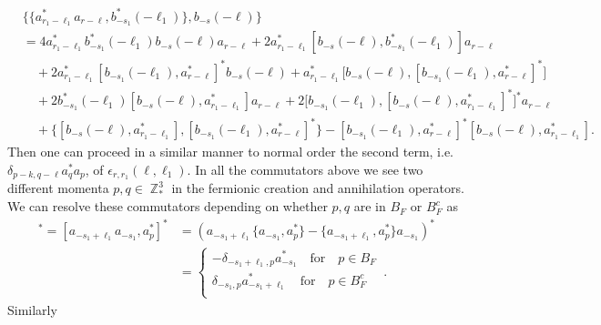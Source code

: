 \documentclass[sn-mathphys, Numbered ,a4paper]{sn-jnl}%
\DeclareMathOperator{\Z}{\mathbb{Z}}
\theoremstyle{plain}
\theoremstyle{definition}
\theoremstyle{remark}
\theoremstyle{plain}
\theoremstyle{definition}
\theoremstyle{remark}
\begin{document}
\begin{align}
    &\big\{\{a^*_{r_1-\ell_1}a_{r-\ell}, b^*_{-s_1}(-\ell_1)\},b_{-s}(-\ell)\big\}\nonumber\\
    &= 4a^*_{  r_1-\ell_1}b^*_{-s_1}(-\ell_1)b_{-s}(-\ell)a_{ r-\ell} + 2a^*_{  r_1-\ell_1}[b_{-s}(-\ell),b^*_{-s_1}(-\ell_1)]a_{ r-\ell}\nonumber\\ 
    &\quad + 2a^*_{r_1-\ell_1}[b_{-s_1}(-\ell_1),a^*_{ r-\ell}]^*b_{-s}(-\ell) + a^*_{  r_1-\ell_1}\big[b_{-s}(-\ell),[b_{-s_1}(-\ell_1),a^*_{ r-\ell}]^*\big]\nonumber\\
    &\quad + 2b^*_{-s_1}(-\ell_1)[b_{-s}(-\ell),a^*_{  r_1-\ell_1}]a_{ r-\ell} +2\big[b_{-s_1}(-\ell_1),[b_{-s}(-\ell),a^*_{  r_1-\ell_1}]^*\big]^*a_{ r-\ell}\nonumber\\
    &\quad + \big\{ [b_{-s}(-\ell),a^*_{  r_1-\ell_1}],[b_{-s_1}(-\ell_1), a^*_{ r-\ell}]^* \big\} - [ b_{-s_1}(-\ell_1), a^*_{ r-\ell}]^* [b_{-s}(-\ell), a^*_{r_1-\ell_1}].\label{eq:no2comm}
\end{align}
Then one can proceed in a similar manner to normal order the second term, i.e. $\delta_{p-k,q-\ell}a^*_{q}a_{p}$, of $\epsilon_{r,r_1}(\ell, \ell_1)$. In all the commutators above we see two different momenta $p,q \in \Z^3_*$ in the fermionic creation and annihilation operators. We can resolve these commutators depending on whether $p,q$ are in $B_{F}$ or $B_{F}^c$ as 
\begin{align}
	[b_{-s_1}(-\ell_1), a^*_{p}]^* = [a_{-s_1+\ell_1}a_{-s_1}, a^*_{p}]^* &=\left(a_{-s_1+\ell_1}\{a_{-s_1}, a^*_{p}\}-\{a_{-s_1+\ell_1}, a^*_{p}\}a_{-s_1} \right)^*\nonumber\\ 
	&=\begin{cases}
		-\delta_{-s_1+\ell_1,p}a^*_{-s_1} \quad\text{for}\quad p \in B_F\\
		\delta_{-s_1,p}a^*_{-s_1+\ell_1} \quad\text{for}\quad p \in B^c_F\\
	\end{cases}\label{eq:comm1}\,.
\end{align}
Similarly
\end{document}
